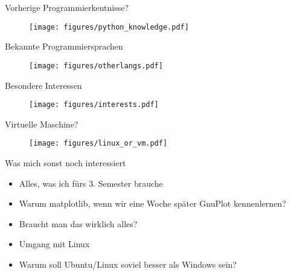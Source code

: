
\begin{frame}{Vorherige Programmierkentnisse?}
    \begin{figure}
        \centering
        \texttt{[image: figures/python\_knowledge.pdf]}
    \end{figure}
\end{frame}

\begin{frame}{Bekannte Programmiersprachen}
    \begin{figure}
        \centering
        \texttt{[image: figures/otherlangs.pdf]}
    \end{figure}
\end{frame}

\begin{frame}{Besondere Interessen}
    \begin{figure}
        \centering
        \texttt{[image: figures/interests.pdf]}
    \end{figure}
\end{frame}

\begin{frame}{Virtuelle Maschine?}
    \begin{figure}
        \centering
        \texttt{[image: figures/linux\_or\_vm.pdf]}
    \end{figure}
\end{frame}

\begin{frame}{Was mich sonst noch interessiert}
    \begin{itemize}
        \item Alles, was ich fürs 3. Semester brauche
        \item Warum matplotlib, wenn wir eine Woche später GnuPlot kennenlernen?
        \item Braucht man das wirklich alles?
        \item Umgang mit Linux
        \item Warum soll Ubuntu/Linux soviel besser als Windows sein?
    \end{itemize}
\end{frame}
